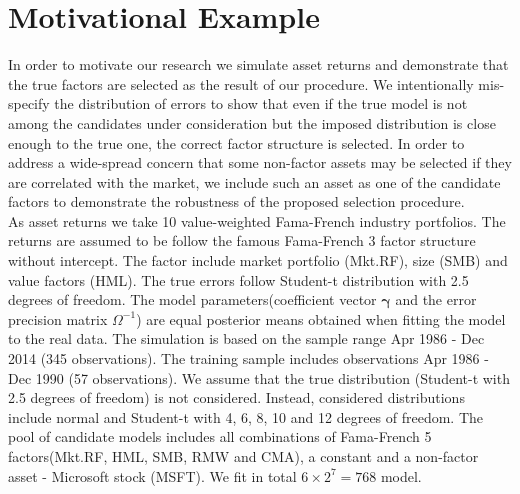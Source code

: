 
\section{Motivational Example}
In order to motivate our research we simulate asset returns and demonstrate that the true factors are selected as the result of our procedure.
We intentionally mis-specify the distribution of errors to show that even if the true model is not among the candidates under consideration but the imposed distribution is close enough to the true one, the correct factor structure is selected. 
In order to address a wide-spread concern that some non-factor assets may be selected if they are correlated with the market, we include such an asset as one of the candidate factors to demonstrate the robustness of the proposed selection procedure.\\
As asset returns we take 10 value-weighted Fama-French industry portfolios. 
The returns are assumed to be follow the famous Fama-French 3 factor structure without intercept. The factor include market portfolio (Mkt.RF), size (SMB) and value factors (HML). 
The true errors follow Student-t distribution with 2.5 degrees of freedom. 
The model parameters(coefficient vector $\boldsymbol{\gamma}$ and the error precision matrix $\Omega^{-1}$) are equal posterior means obtained when fitting the model to the real data. 
The simulation is based on the sample range Apr 1986 - Dec 2014 (345 observations). 
The training sample includes observations Apr 1986 - Dec 1990 (57 observations).
We assume that the true distribution (Student-t with 2.5 degrees of freedom) is not considered. 
Instead, considered distributions include normal and Student-t with 4, 6, 8, 10 and 12 degrees of freedom. 
The pool of candidate models includes all combinations of Fama-French 5 factors(Mkt.RF, HML, SMB, RMW and CMA), a constant and a non-factor asset - Microsoft stock (MSFT). We fit in total $6\times 2^{7} = 768$ model. 



